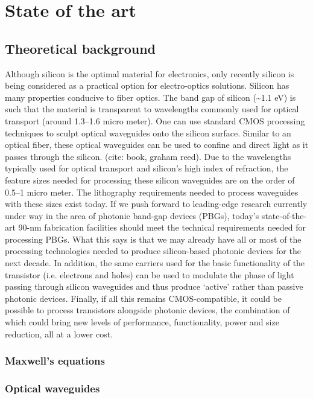 \documentclass[../report.tex]{subfiles}
\begin{document}
	
	
\chapter{State of the art}

	\section{Theoretical background}
Although silicon is the optimal material for electronics, only recently silicon is being considered as a practical option for electro-optics solutions. Silicon has many properties conducive to fiber optics. The band gap of silicon (\textasciitilde1.1 eV) is such that the material is transparent to wavelengths commonly used for optical transport (around 1.3–1.6 micro meter). One can use standard CMOS processing techniques to sculpt optical waveguides onto the silicon surface. Similar to an optical fiber, these optical waveguides can be used to confine and direct light as it passes through the silicon. (cite: book, graham reed). Due to the wavelengths typically used for optical transport and silicon’s high index of refraction, the feature sizes needed for processing these silicon waveguides are on the order of 0.5–1 micro meter. The lithography requirements needed to process waveguides with these sizes exist today. If we push forward to leading-edge research currently under way in the area of photonic band-gap devices (PBGs), today’s state-of-the-art 90-nm fabrication facilities should meet the technical requirements needed for processing PBGs. What this says is that we may already have all or most of the processing technologies needed to produce silicon-based photonic devices for the next decade. In addition, the same carriers used for the basic functionality of the transistor (i.e. electrons and holes) can be used to modulate the phase of light passing through silicon waveguides and thus produce ‘active’ rather than passive photonic devices. Finally, if all this remains CMOS-compatible, it could be possible to process transistors alongside photonic devices, the combination of which could bring new levels of performance, functionality, power and size reduction, all at a lower cost.
		
		\subsection{Maxwell's equations}
	
		\subsection{Optical waveguides}
	
\end{document}
